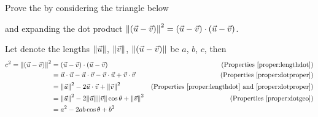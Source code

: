 \begin{exmp}
Prove the  by considering the triangle below
\begin{center}
\end{center}
and expanding the dot product $\norm{(\vec{u}-\vec{v})}^2 = (\vec{u}-\vec{v}) \cdot (\vec{u}-\vec{v})$.    
\end{exmp}
\begin{solution}
Let denote the lengths $\norm{\vec{u}}$, $\norm{\vec{v}}$, $\norm{(\vec{u}-\vec{v})}$ be $a$, $b$, $c$, then
\begin{align*}
c^2 = \norm{(\vec{u}-\vec{v})}^2 &= (\vec{u}-\vec{v}) \cdot (\vec{u}-\vec{v}) & \text{(Properties \ref{proper:lengthdot})} \\
&= \vec{u} \cdot \vec{u} - \vec{u} \cdot \vec{v} - \vec{v} \cdot \vec{u} + \vec{v} \cdot \vec{v} & \text{(Properties \ref{proper:dotproper})} \\
&= \norm{\vec{u}}^2 - 2\vec{u} \cdot \vec{v} + \norm{\vec{v}}^2 & \text{(Properties \ref{proper:lengthdot} and \ref{proper:dotproper})} \\
&= \norm{\vec{u}}^2 - 2\norm{\vec{u}}\norm{\vec{v}}\cos\theta + \norm{\vec{v}}^2 & \text{(Properties \ref{proper:dotgeo})} \\
&= a^2 - 2ab\cos\theta + b^2
\end{align*}
\end{solution}

